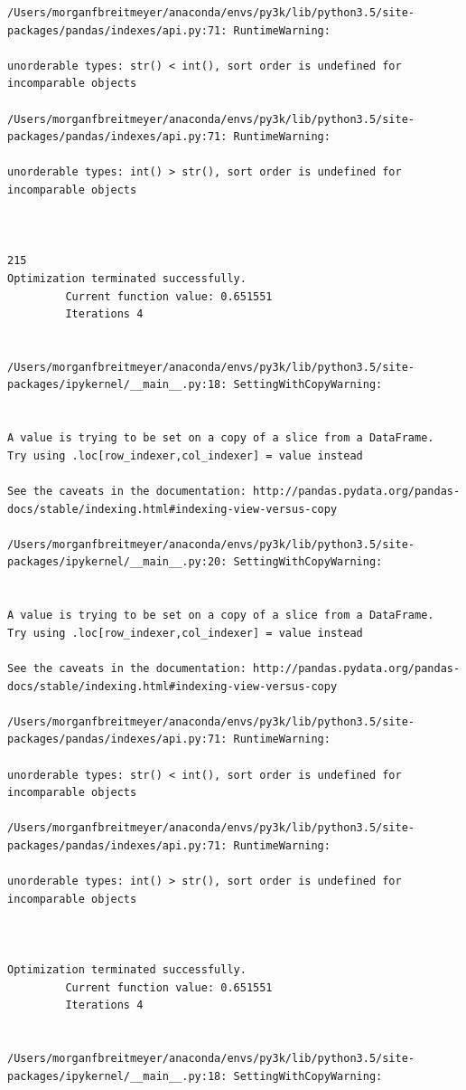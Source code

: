 \begin{lstlisting}
/Users/morganfbreitmeyer/anaconda/envs/py3k/lib/python3.5/site-packages/pandas/indexes/api.py:71: RuntimeWarning:

unorderable types: str() < int(), sort order is undefined for incomparable objects

/Users/morganfbreitmeyer/anaconda/envs/py3k/lib/python3.5/site-packages/pandas/indexes/api.py:71: RuntimeWarning:

unorderable types: int() > str(), sort order is undefined for incomparable objects



215
Optimization terminated successfully.
         Current function value: 0.651551
         Iterations 4


/Users/morganfbreitmeyer/anaconda/envs/py3k/lib/python3.5/site-packages/ipykernel/__main__.py:18: SettingWithCopyWarning:


A value is trying to be set on a copy of a slice from a DataFrame.
Try using .loc[row_indexer,col_indexer] = value instead

See the caveats in the documentation: http://pandas.pydata.org/pandas-docs/stable/indexing.html#indexing-view-versus-copy

/Users/morganfbreitmeyer/anaconda/envs/py3k/lib/python3.5/site-packages/ipykernel/__main__.py:20: SettingWithCopyWarning:


A value is trying to be set on a copy of a slice from a DataFrame.
Try using .loc[row_indexer,col_indexer] = value instead

See the caveats in the documentation: http://pandas.pydata.org/pandas-docs/stable/indexing.html#indexing-view-versus-copy

/Users/morganfbreitmeyer/anaconda/envs/py3k/lib/python3.5/site-packages/pandas/indexes/api.py:71: RuntimeWarning:

unorderable types: str() < int(), sort order is undefined for incomparable objects

/Users/morganfbreitmeyer/anaconda/envs/py3k/lib/python3.5/site-packages/pandas/indexes/api.py:71: RuntimeWarning:

unorderable types: int() > str(), sort order is undefined for incomparable objects



Optimization terminated successfully.
         Current function value: 0.651551
         Iterations 4


/Users/morganfbreitmeyer/anaconda/envs/py3k/lib/python3.5/site-packages/ipykernel/__main__.py:18: SettingWithCopyWarning:



\end{lstlisting}

